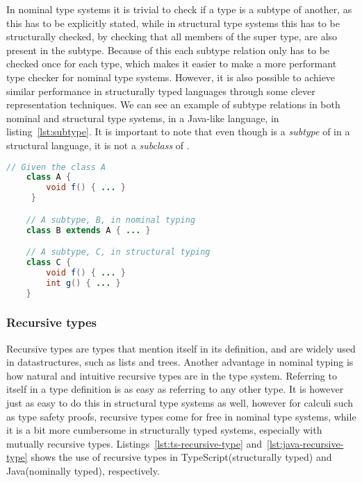 In nominal type systems it is trivial to check if a type is a subtype of another, as this has to be explicitly stated, while in structural type systems this has to be structurally checked, by checking that all members of the super type, are also present in the subtype.
Because of this each subtype relation only has to be checked once for each type, which makes it easier to make a more performant type checker for nominal type systems.
However, it is also possible to achieve similar performance in structurally typed languages through some clever representation techniques. %
We can see an example of subtype relations in both nominal and structural type systems, in a Java-like language, in listing~\vref{lst:subtype}.
It is important to note that even though  is a \emph{subtype} of  in a structural language, it is not a \emph{subclass} of .

\begin{lstlisting}[label={lst:subtype}, caption={Example of subtype relations in nominal and structural typing, with a Java-like language.}, language=Java]
    // Given the class A
    class A {
        void f() { ... }
     }

    // A subtype, B, in nominal typing
    class B extends A { ... }

    // A subtype, C, in structural typing
    class C {
        void f() { ... }
        int g() { ... }
    }
\end{lstlisting}

\subsubsection{Recursive types}\label{subsubsec:recursive-types}

Recursive types are types that mention itself in its definition, and are widely used in datastructures, such as lists and trees.
Another advantage in nominal typing is how natural and intuitive recursive types are in the type system.
Referring to itself in a type definition is as easy as referring to any other type.
It is however just as easy to do this in structural type systems as well, however for calculi such as type safety proofs, recursive types come for free in nominal type systems, while it is a bit more cumbersome in structurally typed systems, especially with mutually recursive types\cite{tapl}.
Listings~\vref{lst:ts-recursive-type} and~\vref{lst:java-recursive-type} shows the use of recursive types in TypeScript(structurally typed) and Java(nominally typed), respectively.

